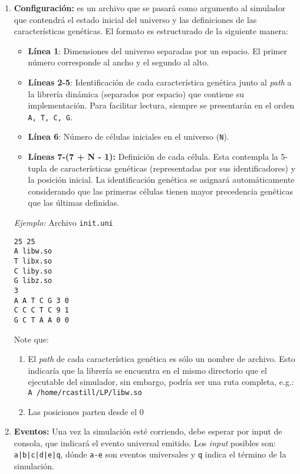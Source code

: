 \documentclass[letterpaper,10pt]{article}
\begin{document}
\begin{enumerate}
	\item \textbf{Configuración:} es un archivo que se pasará como argumento al simulador que contendrá el estado inicial del universo y las definiciones de las características genéticas. El formato es estructurado de la siguiente manera:
	\begin{itemize}
		\item \textbf{Línea 1}: Dimensiones del universo separadas por un espacio. El primer número corresponde al ancho y el segundo al alto.
		\item \textbf{Líneas 2-5}: Identificación de cada característica genética junto al \emph{path} a la librería dinámica (separados por espacio) que contiene su implementación. Para facilitar lectura, siempre se presentarán en el orden \texttt{A, T, C, G}.
		\item \textbf{Línea 6}: Número de células iniciales en el universo (\texttt{N}).
		\item \textbf{Líneas 7-(7 + N - 1):} Definición de cada célula. Esta contempla la 5-tupla de características genéticas (representadas por sus identificadores) y la posición inicial. La identificación genética se asignará automáticamente considerando que las primeras células tienen mayor precedencia genéticas que las últimas definidas.
	\end{itemize}

\emph{Ejemplo:} Archivo \texttt{init.uni}
\begin{lstlisting}
25 25
A libw.so
T libx.so
C liby.so
G libz.so
3
A A T C G 3 0
C C C T C 9 1
G C T A A 0 0
\end{lstlisting}

Note que:
\begin{enumerate}
\item El \emph{path} de cada característica genética es sólo un nombre de archivo. Esto indicaría que la librería se encuentra en el mismo directorio que el ejecutable del simulador, sin embargo, podría ser una ruta completa, e.g.: \texttt{A /home/rcastill/LP/libw.so}
\item Las posiciones parten desde el 0
\end{enumerate}

	\item \textbf{Eventos:} Una vez la simulación esté corriendo, debe esperar por input de consola, que indicará el evento universal emitido. Los \emph{input} posibles son: \texttt{a|b|c|d|e|q}, dónde \texttt{a-e} son eventos universales y \texttt{q} indica el término de la simulación.

\end{enumerate}
\end{document}
